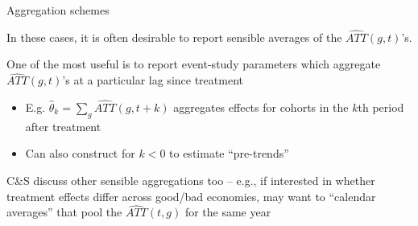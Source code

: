 \documentclass[aspectratio = 169, 13pt]{beamer}
\begin{document}
\begin{frame}{Aggregation schemes}
	\begin{wideitemize}
		\item
		In these cases, it is often desirable to report sensible averages of the $\widehat{ATT}(g,t)$'s.
		
		\pause
		\item
		One of the most useful is to report event-study parameters which aggregate $\widehat{ATT}(g,t)$'s at a particular lag since treatment
		\begin{itemize}
			\item E.g. $\hat{\theta}_k = \sum_g \widehat{ATT}(g, t+k)$ aggregates effects for cohorts in the $k$th period after treatment
			
			\item Can also construct for $k<0$ to estimate ``pre-trends''
		\end{itemize}
		
		\pause
		\item
		C\&S discuss other sensible aggregations too -- e.g., if interested in whether treatment effects differ across good/bad economies, may want to ``calendar averages'' that pool the $\widehat{ATT}(t,g)$ for the same year
	\end{wideitemize}
	
\end{frame}
\end{document}
